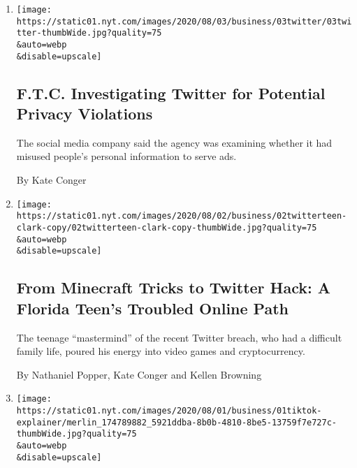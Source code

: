 \begin{enumerate}
\def\labelenumi{\arabic{enumi}.}
\item
  \href{/2020/08/03/technology/ftc-twitter-privacy-violations.html}{}

  \texttt{[image: https://static01.nyt.com/images/2020/08/03/business/03twitter/03twitter-thumbWide.jpg?quality=75\\\&auto=webp\\\&disable=upscale]}

  \hypertarget{ftc-investigating-twitter-for-potential-privacy-violations}{%
  \subsection{F.T.C. Investigating Twitter for Potential Privacy
  Violations}\label{ftc-investigating-twitter-for-potential-privacy-violations}}

  The social media company said the agency was examining whether it had
  misused people's personal information to serve ads.

  By Kate Conger
\item
  \href{/2020/08/02/technology/florida-teenager-twitter-hack.html}{}

  \texttt{[image: https://static01.nyt.com/images/2020/08/02/business/02twitterteen-clark-copy/02twitterteen-clark-copy-thumbWide.jpg?quality=75\\\&auto=webp\\\&disable=upscale]}

  \hypertarget{from-minecraft-tricks-to-twitter-hack-a-florida-teens-troubled-online-path}{%
  \subsection{From Minecraft Tricks to Twitter Hack: A Florida Teen's
  Troubled Online
  Path}\label{from-minecraft-tricks-to-twitter-hack-a-florida-teens-troubled-online-path}}

  The teenage ``mastermind'' of the recent Twitter breach, who had a
  difficult family life, poured his energy into video games and
  cryptocurrency.

  By Nathaniel Popper, Kate Conger and Kellen Browning
\item
  \href{/2020/08/01/technology/tiktok-trump-microsoft-bytedance-china-ban.html}{}

  \texttt{[image: https://static01.nyt.com/images/2020/08/01/business/01tiktok-explainer/merlin\_174789882\_5921ddba-8b0b-4810-8be5-13759f7e727c-thumbWide.jpg?quality=75\\\&auto=webp\\\&disable=upscale]}

  \hypertarget{whats-going-on-with-tiktok-heres-what-we-know}{%
}
\end{enumerate}
